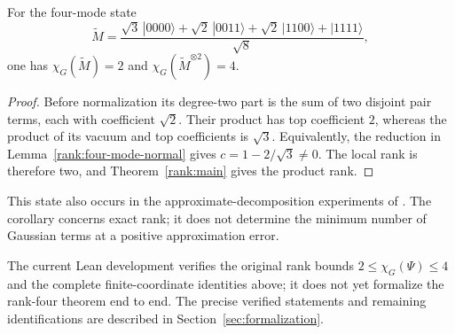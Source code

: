 \begin{corollary}\label{rank:second-magic-state}
For the four-mode state
\[
 \widetilde M=\frac{\sqrt3\,|0000\rangle
   +\sqrt2\,|0011\rangle+\sqrt2\,|1100\rangle+|1111\rangle}{\sqrt8},
\]
one has $\chi_G(\widetilde M)=2$ and
$\chi_G(\widetilde M^{\otimes2})=4$.
\end{corollary}
\begin{proof}
Before normalization its degree-two part is the sum of two disjoint
pair terms, each with coefficient $\sqrt2$. Their product has top
coefficient $2$, whereas the product of its vacuum and top coefficients
is $\sqrt3$. Equivalently, the reduction in
Lemma~\ref{rank:four-mode-normal} gives
$c=1-2/\sqrt3\ne0$. The local rank is therefore two, and
Theorem~\ref{rank:main} gives the product rank.
\end{proof}
This state also occurs in the approximate-decomposition experiments of
\cite{cudby2023}. The corollary concerns exact rank; it does not determine
the minimum number of Gaussian terms at a positive approximation error.

The current Lean development verifies the original rank bounds
$2\le\chi_G(\Psi)\le4$ and the complete finite-coordinate identities above;
it does not yet formalize the rank-four theorem end to end.
The precise verified statements and remaining identifications are described
in Section~\ref{sec:formalization}.
